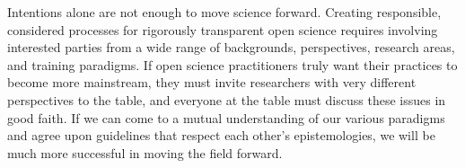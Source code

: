 \documentclass[authordate, meta]{jote-new-article}
\begin{document}
Intentions alone are not enough to move science forward. Creating responsible, considered processes for rigorously transparent open science requires involving interested parties from a wide range of backgrounds, perspectives, research areas, and training paradigms. If open science practitioners truly want their practices to become more mainstream, they must invite researchers with very different perspectives to the table, and everyone at the table must discuss these issues in good faith. If we can come to a mutual understanding of our various paradigms and agree upon guidelines that respect each other’s epistemologies, we will be much more successful in moving the field forward.



\printbibliography
\end{document}
